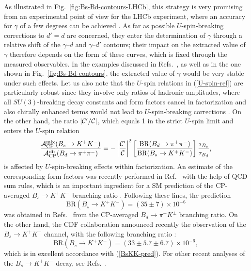\documentclass[11pt]{cernrep}
\begin{document}
As illustrated in Fig.~\ref{fig:Bs-Bd-contours-LHCb},
this strategy is very promising from an experimental point of view
for the LHCb experiment, where an accuracy for $\gamma$ of a few degrees
can be achieved \cite{LHC-Book,schneider,LHCb-analyses}. As far as 
possible $U$-spin-breaking 
corrections to $d'=d$ are concerned, they enter the determination of $\gamma$ 
through a relative shift of the $\gamma$--$d$ and $\gamma$--$d'$ contours; 
their impact on the extracted value of $\gamma$ therefore depends on the form 
of these curves, which is fixed through the measured observables. In the examples discussed in Refs.~\cite{RF-Phys-Rep,RF-BsKK}, as well as in the one
 shown in 
Fig.~\ref{fig:Bs-Bd-contours}, the extracted value of $\gamma$ would be very 
stable under such effects. Let us also note that the $U$-spin
relations in (\ref{U-spin-rel}) are particularly robust since they involve only
ratios of hadronic amplitudes, where all $SU(3)$-breaking decay constants
and form factors cancel in factorization and also chirally enhanced terms
would not lead to  $U$-spin-breaking corrections \cite{RF-BsKK}. 
On the other hand, the ratio $|{\cal C}'/{\cal C}|$, which equals 1 in the strict 
$U$-spin limit and enters the $U$-spin relation
\begin{equation}
\frac{{\cal A}_{\rm CP}^{\rm mix}
(B_s\to K^+K^-)}{{\cal A}_{\rm CP}^{\rm dir}(B_d\to\pi^+\pi^-)}=
-\left|\frac{{\cal C}'}{{\cal C}}\right|^2
\left[\frac{\mbox{BR}(B_d\to\pi^+\pi^-)}{\mbox{BR}(B_s\to K^+K^-)}\right]
\frac{\tau_{B_s}}{\tau_{B_d}},
\end{equation}
is affected by $U$-spin-breaking effects within factorization. An 
estimate of the corresponding form factors was recently performed
in Ref.~\cite{KMM} with the help of QCD sum rules, which is an important 
ingredient for a SM prediction of the CP-averaged $B_s\to K^+K^-$ branching 
ratio \cite{BFRS3}. Following these lines, the prediction
\begin{equation}\label{BsKK-pred}
\mbox{BR}(B_s\to K^+K^-)=(35\pm7)\times 10^{-6}
\end{equation}
was obtained in Refs.~\cite{BFRS3,BFRS-up} from the CP-averaged 
$B_d\to\pi^\mp K^\pm$ branching ratio. On the other hand, the CDF collaboration 
announced recently the observation of the $B_s\to K^+K^-$ channel, with the following 
branching ratio \cite{CDF-BsKK}:
\begin{equation}%
\mbox{BR}(B_s\to K^+K^-)=(33\pm5.7\pm6.7)\times 10^{-6},
\end{equation}
which is in excellent accordance  with (\ref{BsKK-pred}).
For other recent analyses of the $B_s\to K^+K^-$ decay, see Refs.~\cite{safir,BLMV}.
\end{document}
